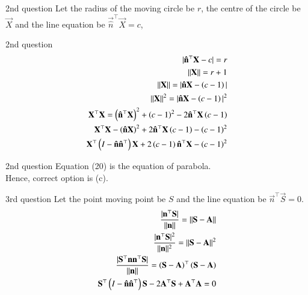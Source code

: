 \documentclass{beamer}
\begin{document}
\begin{frame}{2nd question}
    Let the radius of the moving circle be $r$, the centre of the circle be $\vec{X}$ and the line equation be $\vec{\hat{n}}^\top\vec{X}=c$,
\end{frame}

\begin{frame}{2nd question}
    \begin{align}
    |\mathbf{\hat{n}}^\top\mathbf{X}-c|=r\\
    ||\mathbf{X}||=r+1\\
    ||\mathbf{X}||=|\mathbf{\hat{n}}\mathbf{X}-\left(c-1\right)|\\
    ||\mathbf{X}||^2=|\mathbf{\hat{n}}\mathbf{X}-\left(c-1\right)|^2\\
    \mathbf{X}^\top\mathbf{X}=\left(\mathbf{\hat{n}^\top\mathbf{X}}\right)^2+\left(c-1\right)^2-2\mathbf{\hat{n}}^\top\mathbf{X}\left(c-1\right)\\
    \mathbf{X}^\top\mathbf{X}-\left(\mathbf{\hat{n}}\mathbf{X}\right)^2+2\mathbf{\hat{n}^\top\mathbf{X}}\left(c-1\right)-\left(c-1\right)^2\\
    \mathbf{X}^\top\left(I-\mathbf{\hat{n}}\mathbf{\hat{n}}^\top\right)\mathbf{X}+2\left(c-1\right)\mathbf{\hat{n}^\top\mathbf{X}}-\left(c-1\right)^2
\end{align}
\end{frame}

\begin{frame}{2nd question}
Equation (20) is the equation of parabola.\\
Hence, correct option is (c).
\end{frame}

\begin{frame}{3rd question}
    Let the point moving point be $S$ and the line equation be $\vec{n}^\top\vec{S}=0$.
\begin{align}
    \frac{|\mathbf{n}^\top\mathbf{S}|}{||\mathbf{n}||}=||\mathbf{S}-\mathbf{A}||\\
    \frac{|\mathbf{n}^\top\mathbf{S}|^2}{||\mathbf{n}||^2}=||\mathbf{S}-\mathbf{A}||^2\\
    \frac{|\mathbf{S}^\top\mathbf{n}\mathbf{n}^\top\mathbf{S}|}{||\mathbf{n}||}=\left(\mathbf{S}-\mathbf{A}\right)^\top\left(\mathbf{S}-\mathbf{A}\right)\\
    \mathbf{S}^\top\left(I-\mathbf{\hat{n}}\mathbf{\hat{n}}^\top\right)\mathbf{S}-2\mathbf{A}^\top\mathbf{S}+\mathbf{A}^\top\mathbf{A}=0
\end{align}
\end{frame}
\end{document}
